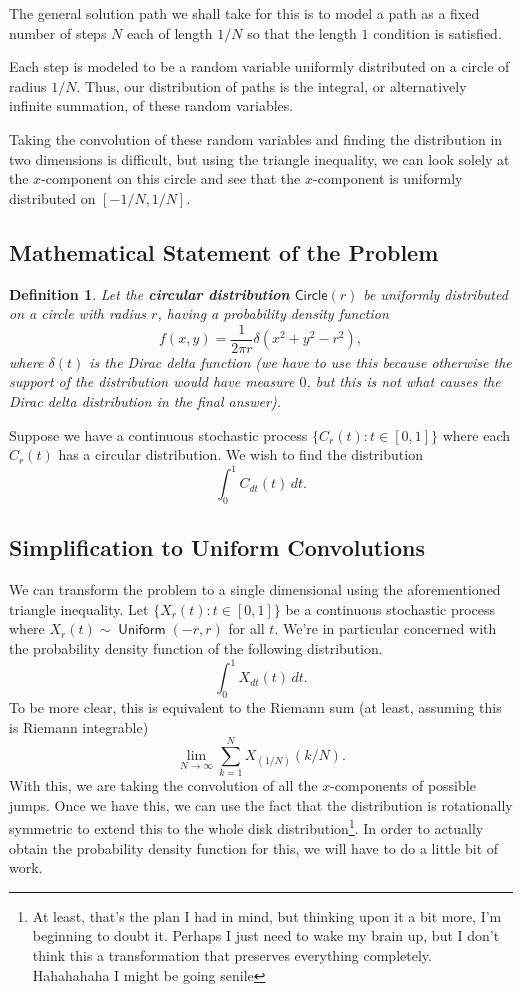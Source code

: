 \documentclass[10pt]{article}
\theoremstyle{customthm}
\newtheorem*{definition}{Definition}
\DeclareMathOperator{\uniform}{\textsf{Uniform}}
\newcommand{\Uniform}[2]{\ensuremath{\uniform \left(#1, #2 \right)}}
\begin{document}
The general solution path we shall take for this is to model a path as a fixed number of steps \( N \) each of length \( 1 / N \) so that the length \( 1 \) condition is satisfied.

Each step is modeled to be a random variable uniformly distributed on a circle of radius \( 1 / N \). Thus, our distribution of paths is the integral, or alternatively infinite summation, of these random variables.

Taking the convolution of these random variables and finding the distribution in two dimensions is difficult, but using the triangle inequality, we can look solely at the \( x \)-component on this circle and see that the \( x \)-component is uniformly distributed on \( [-1/N, 1/N] \).

\subsection*{Mathematical Statement of the Problem}

\begin{definition}
    Let the \textbf{circular distribution} \( \textsf{Circle} (r) \) be uniformly distributed on a circle with radius \( r \), having a probability density function
    \[
        f(x, y) = \frac{1}{2 \pi r} \delta (x^2 + y^2 - r^2)
    ,\]
    where \( \delta(t) \) is the Dirac delta function (we have to use this because otherwise the support of the distribution would have measure \( 0 \), but this is not what causes the Dirac delta distribution in the final answer).
\end{definition}
Suppose we have a continuous stochastic process \( \{ C_r (t) \colon t \in [0, 1] \} \) where each \( C_r (t) \) has a circular distribution. We wish to find the distribution
\[
    \int_0^1 C_{dt} (t) \, dt
.\]

\subsection*{Simplification to Uniform Convolutions}

We can transform the problem to a single dimensional using the aforementioned triangle inequality. Let \( \{ X_r (t) \colon t \in [0, 1] \} \) be a continuous stochastic process where \( X_r (t) \sim \Uniform{-r}{r} \) for all \( t \). We're in particular concerned with the probability density function of the following distribution.
\[
    \int_0^1 X_{dt} (t) \, dt
.\]
To be more clear, this is equivalent to the Riemann sum (at least, assuming this is Riemann integrable)
\[
    \lim_{N \to \infty} \sum_{k = 1}^N X_{(1 / N)} (k / N)
.\]
With this, we are taking the convolution of all the \( x \)-components of possible jumps. Once we have this, we can use the fact that the distribution is rotationally symmetric to extend this to the whole disk distribution\footnote{At least, that's the plan I had in mind, but thinking upon it a bit more, I'm beginning to doubt it. Perhaps I just need to wake my brain up, but I don't think this a transformation that preserves everything completely. Hahahahaha I might be going senile}. In order to actually obtain the probability density function for this, we will have to do a little bit of work.
\end{document}
